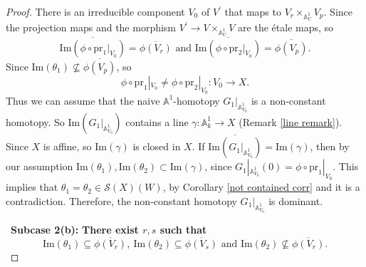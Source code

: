 \documentclass[11pt, reqno]{amsart}
\theoremstyle{plain}
\theoremstyle{definition}
\newcommand{\A}{{\mathbb A}}
\begin{document}
\begin{proof}
There is an irreducible component $V_0$ of $V^\prime$ that maps to $V_r \times_{\mathbb{A}^1_U} V_p$. Since the projection maps and the morphism $V^{\prime} \to V \times_{\mathbb{A}^1_U} V$ are the \'etale maps, so 
$$\overline{\text{Im}(\phi \circ \text{pr}_1|_{V_0})} = \overline{\phi(V_r)} \text{ and } \overline{\text{Im}(\phi \circ \text{pr}_2|_{V_0})} = \overline{\phi(V_p)}.$$
Since $\text{Im}(\theta_1) \nsubseteq \overline{\phi(V_p)}$, so
$$\phi \circ \text{pr}_1|_{V_0} \neq \phi \circ \text{pr}_2|_{V_0}: V_0 \to X.$$
Thus we can assume that the naive $\mathbb{A}^1$-homotopy $G_1|_{\mathbb{A}^1_{V_0}}$ is a non-constant homotopy. So $\text{Im}(G_1|_{\mathbb{A}^1_{V_0}})$ contains a line $\gamma: \A^1_k \to X$ (Remark \ref{line remark}). Since $X$ is affine, so $\text{Im}(\gamma)$ is closed in $X$.  If $\overline{\text{Im}(G_1|_{\mathbb{A}^1_{V_0}})} = \text{Im}(\gamma)$, then by our assumption $\text{Im}(\theta_1), \text{Im}(\theta_2) \subset \text{Im}(\gamma)$, since $G_1|_{\mathbb{A}^1_{V_0}}(0) = \phi \circ \text{pr}_1|_{V_0}$. This implies that $\theta_1 = \theta_2 \in \mathcal{S}(X)(W)$, by Corollary \ref{not contained corr} and it is a contradiction. Therefore, the non-constant homotopy $G_1|_{\mathbb{A}^1_{V_0}}$ is dominant.

\
\textbf{Subcase 2(b):} \textbf{There exist $r,s$ such that 
$$\text{Im}(\theta_1) \subseteq \overline{\phi(V_r)}, \ \text{Im}(\theta_2) \subseteq \overline{\phi(V_s)} \text{ and } \text{Im}(\theta_2) \nsubseteq \overline{\phi(V_r)}.$$
}



\end{proof}
\end{document}
